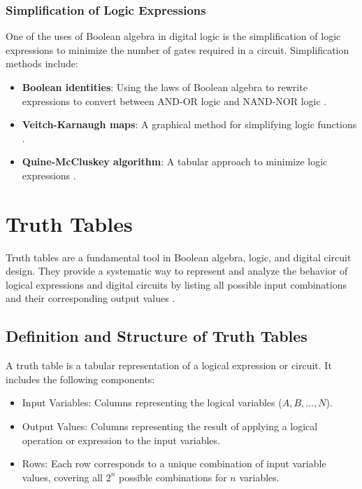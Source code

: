 \subsubsection{Simplification of Logic Expressions}
One of the uses of Boolean algebra in digital logic is the simplification of logic expressions to minimize the number of gates required in a circuit. Simplification methods include:

\begin{itemize}
    \item \textbf{Boolean identities}: Using the laws of Boolean algebra to rewrite expressions  to convert between AND-OR logic and NAND-NOR logic \cite{rosen2018}.
    \item \textbf{Veitch-Karnaugh maps}: A graphical method for simplifying logic functions \cite{Veitch52, karnaugh1953}.
    \item \textbf{Quine-McCluskey algorithm}: A tabular approach to minimize logic expressions \cite{quine1952}.
\end{itemize}

\section{Truth Tables}
Truth tables are a fundamental tool in Boolean algebra, logic, and digital circuit design. They provide a systematic way to represent and analyze the behavior of logical expressions and digital circuits by listing all possible input combinations and their corresponding output values \cite{rosen2018, tanenbaum2013}.

\subsection{Definition and Structure of Truth Tables}
A truth table is a tabular representation of a logical expression or circuit. It includes the following components:
\begin{itemize}
    \item Input Variables: Columns representing the logical variables (\( A, B, \ldots, N \)).
    \item Output Values: Columns representing the result of applying a logical operation or expression to the input variables.
    \item Rows: Each row corresponds to a unique combination of input variable values, covering all \( 2^n \) possible combinations for \( n \) variables.
\end{itemize}

